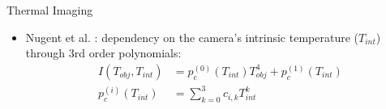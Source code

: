 \begin{frame}{Thermal Imaging}
  \begin{itemize}
    \begin{exampleblock}{Stephan-Boltzmann}
      \begin{equation*} \label{eq:stephan-boltzmann-ideal}
        I(T_\mathit{obj}) = \int_0^\infty \frac{2\pi hc^2}{\lambda^5}\frac{1}{e^{\frac{hc}{\lambda kT_\mathit{obj}}} - 1} d\lambda = \frac{\sigma}{\pi} T_\mathit{obj}^4 \; \; \left[W sr^{-1} m^{-2}\right]
      \end{equation*}
    \end{exampleblock}  
    \item Nugent et al. \cite{10.1117/1.OE.52.6.061304}: dependency on the camera's intrinsic temperature ($T_\mathit{int}$) through 3rd order polynomials:
    \begin{equation*} \label{eq:IntensityVsTemperatures}
      \begin{split}            
        I(T_\mathit{obj}, T_\mathit{int}) &= p^{(0)}_c(T_\mathit{int}) T^4_\mathit{obj} + p^{(1)}_c(T_\mathit{int})\\
        p^{(i)}_c(T_\mathit{int}) &= \sum_{k=0}^3  c_{i,k} T_\mathit{int}^k
    \end{split}
    \end{equation*}
  \end{itemize}
\end{frame}

